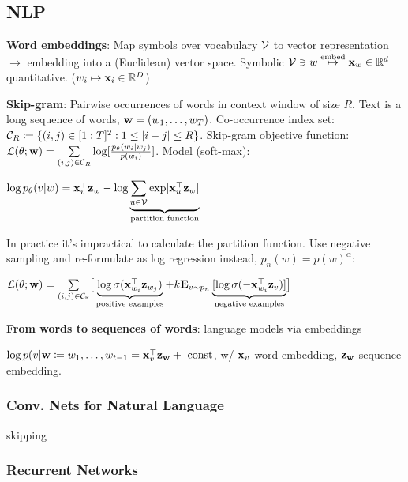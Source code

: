 
\subsection{NLP}
\label{sub:nlp}
    \textbf{Word embeddings}: Map symbols over vocabulary $\mathcal{V}$ to vector representation $\xrightarrow{}$ embedding into a (Euclidean) vector space. Symbolic $\mathcal{V}\ni w \overset{\text{embed}}{\mapsto}\mathbf x_w\in\mathbb R^d$ quantitative. ($w_i\mapsto\mathbf x_i\in\mathbb R^D$)
    
    \textbf{Skip-gram}: Pairwise occurrences of words in context window of size $R$. Text is a long sequence of words, $\mathbf w=(w_1,\ldots,w_T)$. Co-occurrence index set: $\mathcal{C}_R\coloneqq\{(i,j)\in \lbrack 1:T\rbrack^2:1\leq\lvert i-j\rvert\leq R\}$. Skip-gram objective function: $\mathcal{L}(\theta;\mathbf w)=\sum\limits_{(i,j)\in\mathcal{C}_R}\log\lbrack\frac{p_\theta (w_i|w_j)}{p(w_i)}\rbrack$. Model (soft-max): 
    
    \tab$\log p_\theta(v|w)=\mathbf x_v^{\mathop{\mathrm{\top}}}\mathbf z_w-\log\underbrace{\sum_{u\in\mathcal{V}}\exp\lbrack\mathbf x_u^{\mathop{\mathrm{\top}}}\mathbf z_w\rbrack}_\text{partition function}$
    
    In practice it's impractical to calculate the partition function. Use negative sampling and re-formulate as log regression instead, $p_n(w)=p(w)^\alpha$:
    
    \tab$\mathcal{L}(\theta;\mathbf w)=\sum\limits_{(i,j)\in\mathcal{C}_\mathbb R}\bigr\lbrack\underbrace{\log\sigma(\mathbf x_{w_i}^{\mathop{\mathrm{\top}}}\mathbf z_{w_j})}_\text{positive examples}+k\mathbf E_{v\sim p_n}\underbrace{\lbrack\log\sigma(-\mathbf x_{w_i}^{\mathop{\mathrm{\top}}}\mathbf z_v)\rbrack}_\text{negative examples}\bigr\rbrack$
    
    \textbf{From words to sequences of words}: language models via embeddings
    
    \tab$\log p(v|\mathbf w\coloneqq w_1,\ldots,w_{t-1}=\mathbf x_v^{\mathop{\mathrm{\top}}}\mathbf z_\mathbf w+\text{ const}$, w/ $\mathbf x_v$ word embedding, $\mathbf z_\mathbf w$ sequence embedding.
    
    \subsubsection{Conv. Nets for Natural Language}
    \label{ssub:convnetsfornl}
    
    skipping
    
    \subsubsection{Recurrent Networks}
    \label{ssub:recurrentnets}
    
